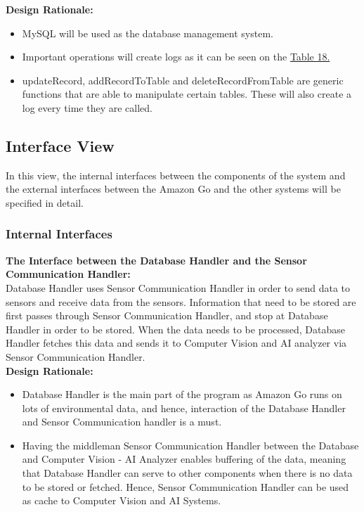 \documentclass[11pt]{article}
\begin{document}
    \textbf{Design Rationale:\\}
    \begin{itemize}
        \item MySQL will be used as the database management system.
        \item Important operations will create logs as it can be seen on the \hyperref[CRUD]{Table 18.}
        \item updateRecord, addRecordToTable and deleteRecordFromTable are generic functions that are able to manipulate certain tables. These will also create a log every time they are called.
    \end{itemize}


    \subsection{Interface View}
    In this view, the internal interfaces between the components of the system and the external interfaces between the 
    Amazon Go and the other systems will be specified in detail.

    
    \subsubsection{Internal Interfaces}
    \textbf{The Interface between the Database Handler and the Sensor Communication Handler:\\}
    Database Handler uses Sensor Communication Handler in order to send data to sensors and receive data from the sensors. Information that need to be stored are first passes
    through Sensor Communication Handler, and stop at Database Handler in order to be stored. When the data needs to be processed, Database Handler fetches this data
    and sends it to Computer Vision and AI analyzer via Sensor Communication Handler. 
    \textbf{\\Design Rationale:}
    \begin{itemize}
        \item  Database Handler is the main part of the program as Amazon Go runs on lots of environmental data, and hence, interaction of the Database Handler and
        Sensor Communication handler is a must.
        \item Having the middleman Sensor Communication Handler between the Database and Computer Vision - AI Analyzer enables buffering of the data, meaning that 
            Database Handler can serve to other components when there is no data to be stored or fetched. Hence, Sensor Communication Handler can be used as cache to Computer
            Vision and AI Systems.
    \end{itemize}
    
\end{document}
